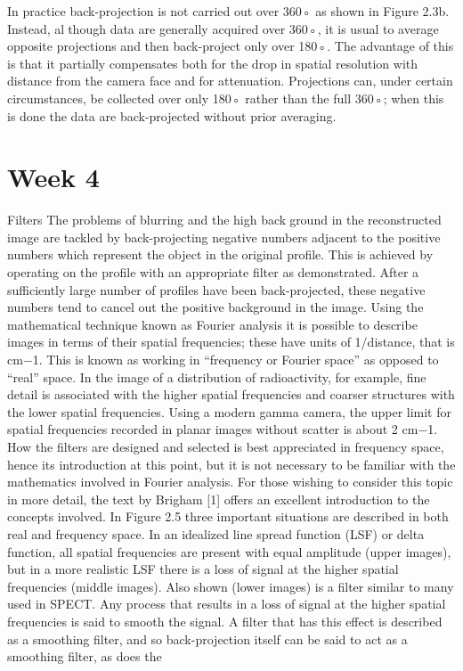 \documentclass[12pt]{article}
\begin{document}
In practice back-projection is not carried out over 360◦ as shown in Figure 2.3b. Instead, although data are generally acquired over 360◦, it is usual to average opposite projections and then back-project only over 180◦. The advantage of
this is that it partially compensates both for the drop in spatial resolution with distance from the camera face and for attenuation. Projections can, under certain circumstances, be collected over only 180◦ rather than the full 360◦; when this is done the data are back-projected without prior
averaging.

\section*{Week 4}
Filters
The problems of blurring and the high background in the reconstructed image are tackled by back-projecting negative numbers adjacent to the
positive numbers which represent the object in the original profile. This is achieved by operating on the profile with an appropriate filter as demonstrated. After a sufficiently large number of profiles have been back-projected, these negative numbers tend to cancel out the positive background in the image. Using the mathematical technique known as Fourier analysis it is possible to describe images in terms of their spatial frequencies; these have units of 1/distance, that is cm−1. This is known as working in “frequency or Fourier space” as opposed to “real” space. In the image of a distribution of radioactivity, for example, fine detail is associated with the higher spatial frequencies and coarser structures with the lower spatial frequencies.
Using a modern gamma camera, the upper limit for spatial frequencies recorded in planar images without scatter is about 2 cm−1. How the filters are designed and selected is best appreciated in frequency space, hence its introduction at this point, but it is not necessary to be familiar with the mathematics involved in Fourier analysis. For those wishing to consider this topic in
more detail, the text by Brigham [1] offers an excellent introduction to the concepts involved. In Figure 2.5 three important situations are described
in both real and frequency space. In an idealized line spread function (LSF) or delta function, all spatial frequencies are present with equal amplitude (upper images), but in a more realistic LSF there is a loss of signal at the higher spatial frequencies (middle images). Also shown (lower images) is a filter similar to many used in SPECT. Any process that results in a loss of signal at the higher spatial frequencies is said to smooth the signal. A filter that has this effect is described as a smoothing filter, and so back-projection itself can be said to act as a smoothing filter, as does the
\end{document}
